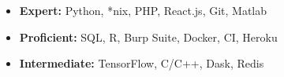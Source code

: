 \begin{cventries}
    \begin{itemize}
        \item \textbf{Expert:} Python, *nix, PHP, React.js, Git, Matlab
        \item \textbf{Proficient:} SQL, R, Burp Suite, Docker, CI, Heroku
        \item \textbf{Intermediate:} TensorFlow, C/C++, Dask, Redis
    \end{itemize}
\end{cventries}
